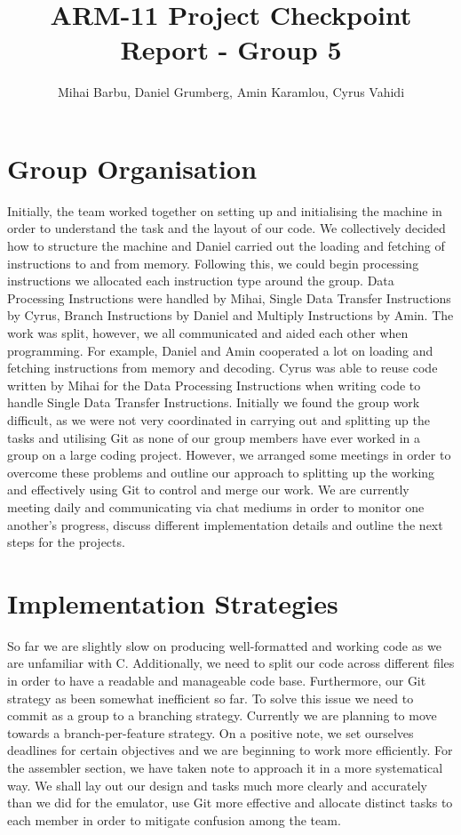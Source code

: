 \documentclass[11pt]{article}
\begin{document}
	
	\title{ARM-11 Project Checkpoint Report - Group 5}
	\author{Mihai Barbu, Daniel Grumberg, Amin Karamlou, Cyrus Vahidi}
	
	\maketitle
	
	\section{Group Organisation}
	
	Initially, the team worked together on setting up and initialising the machine in order to understand the task and the layout of our code. We collectively decided how to structure the machine and  Daniel carried out the loading and fetching of instructions to and from memory.
	Following this, we could begin processing instructions  we allocated each instruction type around the group. Data Processing Instructions were handled by Mihai, Single Data Transfer Instructions by Cyrus, Branch Instructions by Daniel and Multiply Instructions by Amin. The work was split, however, we all communicated and aided each other when programming. For example, Daniel and Amin cooperated a lot on loading and fetching instructions from memory and decoding. Cyrus was able to reuse code written by Mihai for the Data Processing Instructions when writing code to handle Single Data Transfer Instructions. 
	Initially we found the group work difficult, as we were not very coordinated in carrying out and splitting up the tasks and utilising Git as none of our group members have ever worked in a group on a large coding project. However, we arranged some meetings in order to overcome these problems and outline our approach to splitting up the working and effectively using Git to control and merge our work. We are currently meeting daily and communicating via chat mediums in order to monitor one another's progress, discuss different implementation details and outline the next steps for the projects.
	
	\section{Implementation Strategies}
	
	So far we are slightly slow on producing well-formatted and working code as we are unfamiliar with C. Additionally, we need to split our code across different files in order to have a readable and manageable code base. Furthermore, our Git strategy as been somewhat inefficient so far. To solve this issue we need to commit as a group to a branching strategy. Currently we are planning to move towards a branch-per-feature strategy. On a positive note, we set ourselves deadlines for certain objectives and we are beginning to work more efficiently. For the assembler section, we have taken note to approach it in a more systematical way. We shall lay out our design and tasks much more clearly and accurately than we did for the emulator, use Git more effective and allocate distinct tasks to each member in order to mitigate confusion among the team.
	
\end{document}
